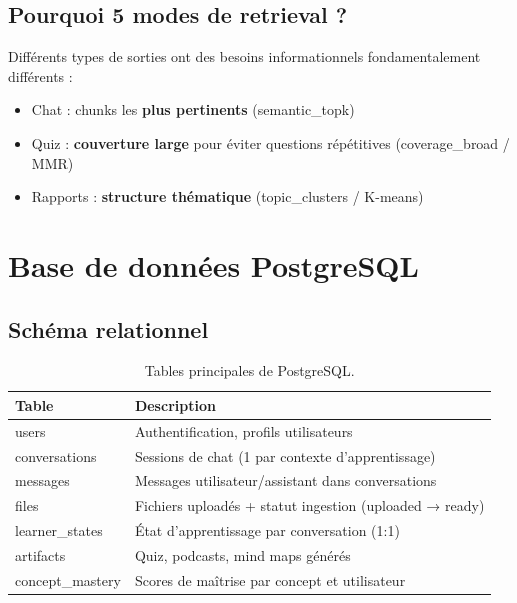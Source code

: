 \documentclass[12pt,a4paper]{article}
\begin{document}
\subsection{Pourquoi 5 modes de retrieval ?}

Différents types de sorties ont des besoins informationnels fondamentalement différents :

\begin{itemize}
    \item Chat : chunks les \textbf{plus pertinents} (semantic\_topk)
    \item Quiz : \textbf{couverture large} pour éviter questions répétitives (coverage\_broad / MMR)
    \item Rapports : \textbf{structure thématique} (topic\_clusters / K-means)
\end{itemize}

\section{Base de données PostgreSQL}

\subsection{Schéma relationnel}

\begin{table}[H]
    \centering
    \small
    \begin{tabularx}{\textwidth}{@{}lX@{}}
        \toprule
        \textbf{Table} & \textbf{Description} \\
        \midrule
        users & Authentification, profils utilisateurs \\
        conversations & Sessions de chat (1 par contexte d'apprentissage) \\
        messages & Messages utilisateur/assistant dans conversations \\
        files & Fichiers uploadés + statut ingestion (uploaded → ready) \\
        learner\_states & État d'apprentissage par conversation (1:1) \\
        artifacts & Quiz, podcasts, mind maps générés \\
        concept\_mastery & Scores de maîtrise par concept et utilisateur \\
        \bottomrule
    \end{tabularx}
    \caption{Tables principales de PostgreSQL.}
\end{table}
\end{document}
